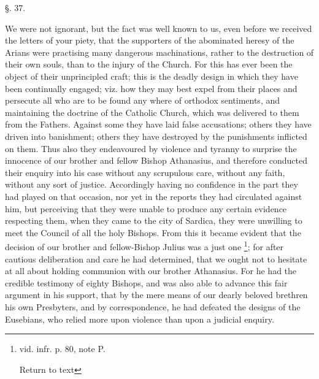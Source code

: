 §. 37.

We were not ignorant, but the fact was well known
to us, even before we received the letters of your piety, that the
supporters of the abominated heresy of the Arians were practising many
dangerous machinations, rather to the destruction of their own souls,
than to the injury of the Church. For this has ever been the object of
their unprincipled craft; this is the deadly design in which they have
been continually engaged; viz. how they may best expel from their
places and persecute all who are to be found any where of orthodox
sentiments, and maintaining the doctrine of the Catholic Church, which
was delivered to them from the Fathers. Against some they have laid
false accusations; others they have driven into banishment; others
they have destroyed by the punishments inflicted on them. Thus also
they endeavoured by violence and tyranny to surprise the innocence of
our brother and fellow Bishop Athanasius, and therefore conducted
their enquiry into his case without any scrupulous care, without any
faith, without any sort of justice. Accordingly having no confidence
in the part they had played on that occasion, nor yet in the reports
they had circulated against him, but perceiving that they were unable
to produce any certain evidence respecting them, when they came to the
city of Sardica, they were unwilling to meet the Council of all the
holy Bishops. From this it became evident that the decision of our
brother and fellow-Bishop Julius was a just one \footnote{vid. infr. p. 80, note P.

Return to text}; for after
cautious deliberation and care he had determined, that we ought not to
hesitate at all about holding communion with our brother Athanasius.
For he had the credible testimony of eighty Bishops, and was also able
to advance this fair argument in his support, that by the mere means
of our dearly beloved brethren his own Presbyters, and by
correspondence, he had defeated the designs of the Eusebians, who
relied more upon violence than upon a judicial enquiry.

